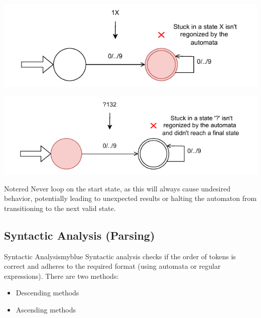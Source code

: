 \vspace{0.85cm}

 \hspace{5.65cm}   \includegraphics{Chapters/Examples/Intro/ex4.3.drawio.pdf}

\vspace{0.85cm}
  \hspace{5.65cm}  \includegraphics{Chapters/Examples/Intro/ex4.4.drawio.pdf}


\vspace{0.85cm}


\begin{prettyBox}{Note}{red}
Never loop on the start state, as this will always cause undesired behavior, potentially leading to unexpected results or halting the automaton from transitioning to the next valid state.
\end{prettyBox}


\subsection{Syntactic Analysis (Parsing)}
\begin{prettyBox}{Syntactic Analysis}{myblue}
Syntactic analysis checks if the order of tokens is correct and adheres to the required format (using automata or regular expressions).  
There are two methods:  
\begin{itemize}
    \item Descending methods  
    \item Ascending methods  
\end{itemize}
\end{prettyBox}

